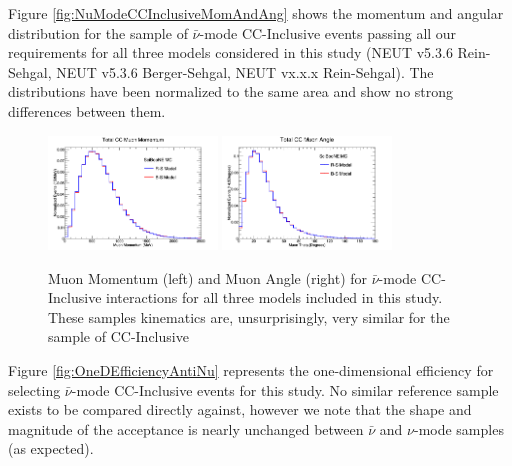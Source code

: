 \documentclass[11pt]{article}
\begin{document}
Figure \ref{fig:NuModeCCInclusiveMomAndAng} shows the momentum and angular distribution for the sample of $\bar{\nu}$-mode CC-Inclusive events passing all our requirements for all three models considered in this study (NEUT v5.3.6 Rein-Sehgal, NEUT v5.3.6 Berger-Sehgal, NEUT vx.x.x Rein-Sehgal). The distributions have been normalized to the same area and show no strong differences between them. 

\begin{figure}[H]
\centering
\includegraphics[width=0.4\textwidth]{CCInclusivePlots/ANMCCInclusiveTotalMomentum.png}
\includegraphics[width=0.4\textwidth]{CCInclusivePlots/ANMCCInclusiveTotalAngle.png}
\caption{Muon Momentum (left) and Muon Angle (right) for $\bar{\nu}$-mode CC-Inclusive interactions for all three models included in this study. These samples kinematics are, unsurprisingly, very similar for the sample of CC-Inclusive}
\end{figure}

Figure \ref{fig:OneDEfficiencyAntiNu} represents the one-dimensional efficiency for selecting $\bar{\nu}$-mode CC-Inclusive events for this study. No similar reference sample exists to be compared directly against, however we note that the shape and magnitude of the acceptance is nearly unchanged between $\bar{\nu}$ and $\nu$-mode samples (as expected).
\end{document}
